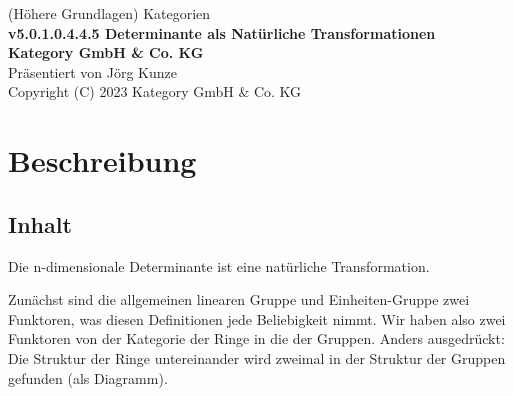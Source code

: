 \documentclass[a4paper]{amsart}
\theoremstyle{definition}
\begin{document}
\begin{titlepage}
\centering
{\huge
(Höhere Grundlagen) Kategorien\\[1cm]
\textbf{v5.0.1.0.4.4.5 Determinante als Natürliche Transformationen}
}\\[1cm]

\textbf{Kategory GmbH \& Co. KG}\\
Präsentiert von Jörg Kunze\\
Copyright (C) 2023 Kategory GmbH \& Co. KG

\end{titlepage}

%

\newpage

\section*{Beschreibung}

\subsection*{Inhalt}
Die n-dimensionale Determinante ist eine natürliche Transformation.

Zunächst sind die allgemeinen linearen Gruppe und Einheiten-Gruppe zwei Funktoren, was diesen Definitionen jede Beliebigkeit nimmt. Wir haben also zwei Funktoren von der Kategorie der Ringe in die der Gruppen. Anders ausgedrückt: Die Struktur der Ringe untereinander wird zweimal in der Struktur der Gruppen gefunden (als Diagramm).
\end{document}
